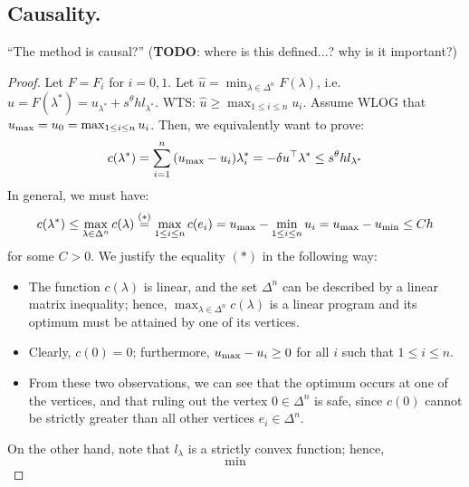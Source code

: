 \documentclass[eikonal.tex]{subfiles}
\begin{document}
\subsection{Causality.}

\begin{theorem}
  ``The method is causal?'' (\textbf{TODO}: where is this
  defined...? why is it important?)
\end{theorem}

\begin{proof}
  Let $F = F_i$ for $i = 0, 1$.  Let
  $\hat{u} = \min_{\lambda \in \Delta^n} F(\lambda)$, i.e.
  $\hat{u} = F(\lambda^*) = u_{\lambda^*} + s^\theta h l_{\lambda^*}$.
  WTS: $\hat{u} \geq \max_{1 \leq i \leq n} u_i$. Assume WLOG that
  $u_{\operatorname{max}} = u_0 = \max_{1\leq i \leq n} u_i$. Then, we equivalently want to
  prove:
  \begin{equation}
    c(\lambda^*) = \sum_{i=1}^n {(u_{\operatorname{max}} - u_i)} \lambda^*_i = -\delta u^\top \lambda^* \leq s^\theta h l_{\lambda^*}
  \end{equation}
  In general, we must have:
  \begin{equation}
    c(\lambda^*) \leq \max_{\lambda \in \Delta^n} c(\lambda) \overset{(*)}{=} \max_{1 \leq i \leq n} c(e_i) = u_{\operatorname{max}} - \min_{1\leq i \leq n} u_i = u_{\operatorname{max}} - u_{\operatorname{min}} \leq Ch
  \end{equation}
  for some $C > 0$. We justify the equality $(*)$ in the following
  way:
  \begin{itemize}
  \item The function $c(\lambda)$ is linear, and the set $\Delta^n$
    can be described by a linear matrix inequality; hence,
    $\max_{\lambda \in \Delta^n} c(\lambda)$ is a linear program and
    its optimum must be attained by one of its vertices.
  \item Clearly, $c(0) = 0$; furthermore, $u_{\operatorname{max}} - u_i \geq 0$ for
    all $i$ such that $1 \leq i \leq n$.
  \item From these two observations, we can see that the optimum
    occurs at one of the vertices, and that ruling out the vertex
    $0 \in \Delta^n$ is safe, since $c(0)$ cannot be strictly greater
    than all other vertices $e_i \in \Delta^n$.
  \end{itemize}
  On the other hand, note that $l_\lambda$ is a strictly convex
  function; hence,
  \begin{equation}
    \min
  \end{equation}
\end{proof}
\end{document}
